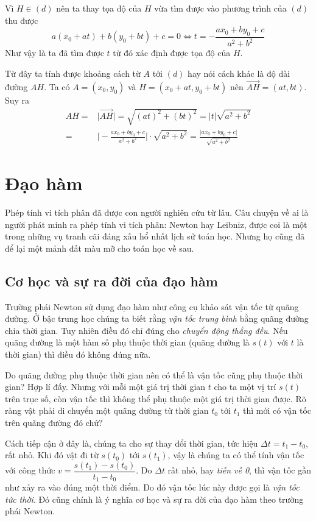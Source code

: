 Vì $H \in (d)$ nên ta thay tọa độ của $H$ vừa tìm được vào phương trình của $(d)$ thu được \[a (x_0 + at) + b (y_0 + bt) + c = 0 \Leftrightarrow t = -\frac{a x_0 + b y_0 + c}{a^2 + b^2}\]
Như vậy là ta đã tìm được $t$ từ đó xác định được tọa độ của $H$.

Từ đây ta tính được khoảng cách từ $A$ tới $(d)$ hay nói cách khác là độ dài đường $AH$. Ta có $A = (x_0, y_0)$ và $H = (x_0 + at, y_0 + bt)$ nên $\overrightarrow{AH} = (at, bt)$. Suy ra
\begin{align*}
	AH = & \lvert \overrightarrow{AH} \rvert = \sqrt{(at)^2 + (bt)^2} = \lvert t \rvert \sqrt{a^2 + b^2} \\ = & \Big| -\frac{a x_0 + b y_0 + c}{a^2 + b^2} \Big| \cdot \sqrt{a^2 + b^2} = \frac{\lvert a x_0 + b y_0 + c \rvert}{\sqrt{a^2 + b^2}}
\end{align*}

\section{Đạo hàm}

Phép tính vi tích phân đã được con người nghiên cứu từ lâu. Câu chuyện về ai là người phát minh ra phép tính vi tích phân: Newton hay Leibniz, được coi là một trong những vụ tranh cãi đáng xấu hổ nhất lịch sử toán học. Nhưng họ cũng đã để lại một mảnh đất màu mỡ cho toán học về sau.

\subsection{Cơ học và sự ra đời của đạo hàm}

Trường phái Newton sử dụng đạo hàm như công cụ khảo sát vận tốc từ quãng đường. Ở bậc trung học chúng ta biết rằng \textit{vận tốc trung bình} bằng quãng đường chia thời gian. Tuy nhiên điều đó chỉ đúng cho \textit{chuyển động thẳng đều}. Nếu quãng đường là một hàm số phụ thuộc thời gian (quãng đường là $s(t)$ với $t$ là thời gian) thì điều đó không đúng nữa.

Do quãng đường phụ thuộc thời gian nên có thể là vận tốc cũng phụ thuộc thời gian? Hợp lí đấy. Nhưng với mỗi một giá trị thời gian $t$ cho ta một vị trí $s(t)$ trên trục số, còn vận tốc thì không thể phụ thuộc một giá trị thời gian được. Rõ ràng vật phải di chuyển một quãng đường từ thời gian $t_0$ tới $t_1$ thì mới có vận tốc trên quãng đường đó chứ?

Cách tiếp cận ở đây là, chúng ta cho sự thay đổi thời gian, tức hiệu $\Delta t = t_1 - t_0$, rất nhỏ. Khi đó vật đi từ $s(t_0)$ tới $s(t_1)$, vậy là chúng ta có thể tính vận tốc với công thức $v = \dfrac{s(t_1) - s(t_0)}{t_1 - t_0}$. Do $\Delta t$ rất nhỏ, hay \textit{tiến về 0}, thì vận tốc gần như xảy ra vào đúng một thời điểm. Do đó vận tốc lúc này được gọi là \textit{vận tốc tức thời}. Đó cũng chính là ý nghĩa cơ học và sự ra đời của đạo hàm theo trường phái Newton.

